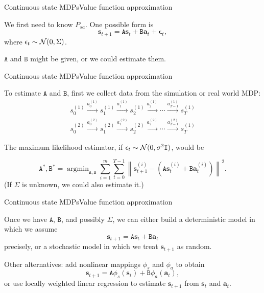 \documentclass{beamer}
\renewcommand{\vec}[1]{\boldsymbol{#1}}
\newcommand{\mat}[1]{\mathtt{#1}}
\DeclareMathOperator*{\argmin}{argmin}
\begin{document}
\begin{frame}{Continuous state MDPs}{Value function approximation}

  We first need to know $P_{sa}$. One possible form is
  \[ \vec{s}_{t+1} = \mat{A}\vec{s}_t + \mat{B}\vec{a}_t + \vec{\epsilon}_t, \]
  where $\epsilon_t \sim {\cal N}(0,\Sigma)$.

  \medskip

  $\mat{A}$ and $\mat{B}$ might be given, or we could estimate them.

\end{frame}


\begin{frame}{Continuous state MDPs}{Value function approximation}

  To estimate $\mat{A}$ and $\mat{B}$, first we collect data from the
  simulation or real world MDP:
  \begin{eqnarray*}
  s_0^{(1)} \stackrel{a_0^{(1)}}{\rightarrow}
  s_1^{(1)} \stackrel{a_1^{(1)}}{\rightarrow}
  s_2^{(1)} \stackrel{a_2^{(1)}}{\rightarrow} \cdots
   \stackrel{a_{T-1}^{(1)}}{\rightarrow} s_T^{(1)} \\
  s_0^{(2)} \stackrel{a_0^{(2)}}{\rightarrow}
  s_1^{(2)} \stackrel{a_1^{(2)}}{\rightarrow}
  s_2^{(2)} \stackrel{a_2^{(2)}}{\rightarrow} \cdots
  \stackrel{a_{T-1}^{(2)}}{\rightarrow} s_T^{(1)}
  \end{eqnarray*}

  \medskip
  
  The maximum likelihood estimator, if
  $\epsilon_t \sim {\cal N}(0,\sigma^2\mat{I})$, would be

  \[ \mat{A}^*,\mat{B}^* = \argmin_{\mat{A},\mat{B}} \sum_{i=1}^m \sum_{t=0}^{T-1}
  \left\| \vec{s}_{t+1}^{(i)}-\left(\mat{A}\vec{s}_t^{(i)} + \mat{B}\vec{a}_t^{(i)}\right) \right\|^2 .\]
  (If $\Sigma$ is unknown, we could also estimate it.)

\end{frame}


\begin{frame}{Continuous state MDPs}{Value function approximation}

  Once we have $\mat{A}$, $\mat{B}$, and possibly $\Sigma$, we
  can either build a \alert{deterministic} model in which we assume
  \[ \vec{s}_{t+1} = \mat{A}\vec{s}_t + \mat{B}\vec{a}_t \]
  precisely, or a \alert{stochastic} model in which we treat
  $\vec{s}_{t+1}$ as random.

  \medskip

  Other alternatives: add nonlinear mappings $\phi_s$ and $\phi_a$ to obtain
  \[ \vec{s}_{t+1} = \mat{A}\phi_s(\vec{s}_t) + \mat{B}\phi_a(\vec{a}_t), \]
  or use locally weighted linear regression to estimate $\vec{s}_{t+1}$ from
    $\vec{s}_t$ and $\vec{a}_t$.
  
\end{frame}
\end{document}
